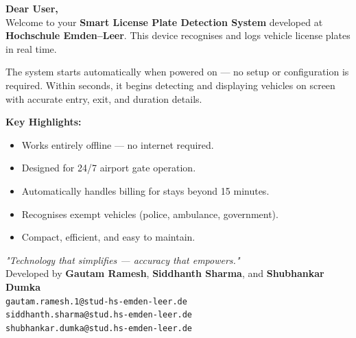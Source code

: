 \begin{tcolorbox}[
	enhanced,
	colback=blue!3!white,
	colframe=blue!70!black,
	coltitle=white,
	title={\faRocket\hspace{0.5em}\textbf{Welcome to the Smart License Plate Detection System}},
	fonttitle=\bfseries\large,
	left=8pt,
	right=8pt,
	top=8pt,
	bottom=8pt,
	boxrule=1pt,
	rounded corners,
	shadow={1mm}{-1mm}{0.3mm}{black!40}, %
	borderline={0.5pt}{0pt}{blue!40!black,dashed},
	before skip=8pt,
	after skip=12pt,
	breakable
	]
	
	\noindent
	\textbf{Dear User,}\\[4pt]
	Welcome to your \textbf{Smart License Plate Detection System} developed at \textbf{Hochschule Emden–Leer}.  
This device recognises and logs vehicle license plates in real time.
	
	\vspace{0.6em}
	\hspace{0.3em}The system starts automatically when powered on — no setup or configuration is required.  
	Within seconds, it begins detecting and displaying vehicles on screen with accurate entry, exit, and duration details.
	
	\vspace{0.6em}
	\faCogs\hspace{0.3em}\textbf{Key Highlights:}
	\begin{itemize}
		\item Works entirely offline — no internet required.
		\item Designed for 24/7 airport gate operation.
		\item Automatically handles billing for stays beyond 15 minutes.
		\item Recognises exempt vehicles (police, ambulance, government).
		\item Compact, efficient, and easy to maintain.
	\end{itemize}
	
	
	\vspace{0.8em}
	\begin{center}
		\textit{"Technology that simplifies — accuracy that empowers."}\\[6pt]
		\small Developed by \textbf{Gautam Ramesh}, \textbf{Siddhanth Sharma}, and \textbf{Shubhankar Dumka}\\[3pt]
		\texttt{gautam.ramesh.1@stud-hs-emden-leer.de}\\
		\texttt{siddhanth.sharma@stud.hs-emden-leer.de}\\
		\texttt{shubhankar.dumka@stud.hs-emden-leer.de}
	\end{center}
	
\end{tcolorbox}

